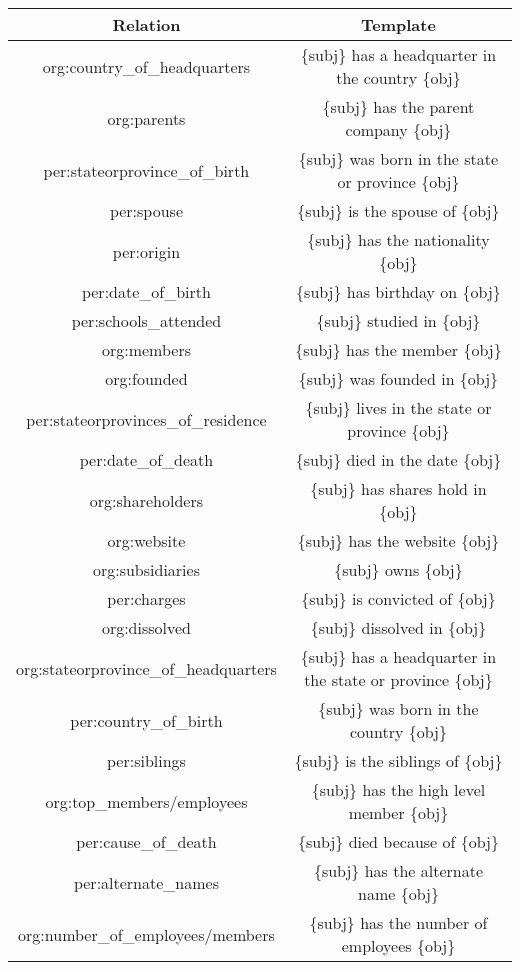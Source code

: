 \begin{table*}[h]
    \centering
    \begin{threeparttable}
    \small
    \begin{tabular}{cc}
    \toprule
    Relation & Template \\
    \midrule
   org:country\_of\_headquarters & \{subj\} has a headquarter in the country \{obj\}\\
org:parents & \{subj\} has the parent company \{obj\}\\
per:stateorprovince\_of\_birth & \{subj\} was born in the state or province \{obj\}\\
per:spouse & \{subj\} is the spouse of \{obj\}\\
per:origin & \{subj\} has the nationality \{obj\}\\
per:date\_of\_birth & \{subj\} has birthday on \{obj\}\\
per:schools\_attended & \{subj\} studied in \{obj\}\\
org:members & \{subj\} has the member \{obj\}\\
org:founded & \{subj\} was founded in \{obj\}\\
per:stateorprovinces\_of\_residence & \{subj\} lives in the state or province \{obj\}\\
per:date\_of\_death & \{subj\} died in the date \{obj\}\\
org:shareholders & \{subj\} has shares hold in \{obj\}\\
org:website & \{subj\} has the website \{obj\}\\
org:subsidiaries & \{subj\} owns \{obj\}\\
per:charges & \{subj\} is convicted of \{obj\}\\
org:dissolved & \{subj\} dissolved in \{obj\}\\
org:stateorprovince\_of\_headquarters & \{subj\} has a headquarter in the state or province \{obj\}\\
per:country\_of\_birth & \{subj\} was born in the country \{obj\}\\
per:siblings & \{subj\} is the siblings of \{obj\}\\
org:top\_members/employees & \{subj\} has the high level member \{obj\}\\
per:cause\_of\_death & \{subj\} died because of \{obj\}\\
per:alternate\_names & \{subj\} has the alternate name \{obj\}\\
org:number\_of\_employees/members & \{subj\} has the number of employees \{obj\}\\

\end{tabular}
\end{threeparttable}
\end{table*}
